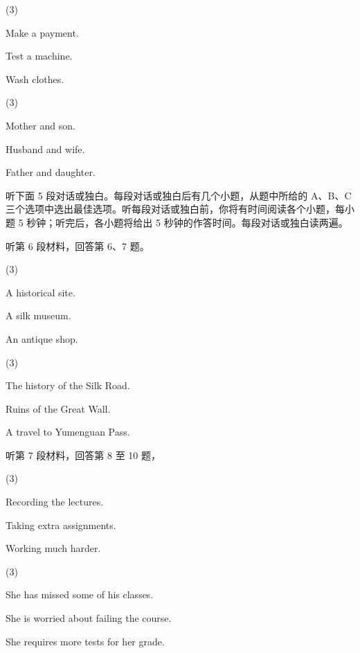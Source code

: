 \documentclass{英语试卷}
\begin{document}
\begin{choices}(3)
  \item Make a payment.
  \item Test a machine.
  \item Wash clothes.
\end{choices}
\begin{choices}(3)
  \item Mother and son.
  \item Husband and wife.
  \item Father and daughter.
\end{choices}
\par 听下面 5 段对话或独白。每段对话或独白后有几个小题，从题中所给的 A、B、C 三个选项中选出最佳选项。听每段对话或独白前，你将有时间阅读各个小题，每小题 5 秒钟；听完后，各小题将给出 5 秒钟的作答时间。每段对话或独白读两遍。\par
\par 听第 6 段材料，回答第 6、7 题。\par
{}
\begin{choices}(3)
  \item A historical site.
  \item A silk museum.
  \item An antique shop.
\end{choices}
\begin{choices}(3)
  \item The history of the Silk Road.
  \item Ruins of the Great Wall.
  \item A travel to Yumenguan Pass.
\end{choices}
\par 听第 7 段材料，回答第 8 至 10 题，\par
{}
\begin{choices}(3)
  \item Recording the lectures.
  \item Taking extra assignments.
  \item Working much harder.
\end{choices}
\begin{choices}(3)
  \item She has missed some of his classes.
  \item She is worried about failing the course.
  \item She requires more tests for her grade.
\end{choices}
\end{document}
